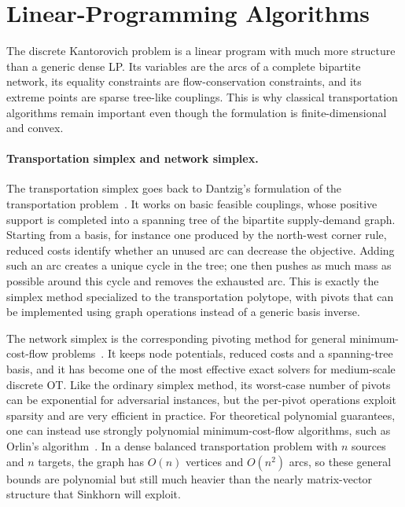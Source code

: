 \section{Linear-Programming Algorithms}
\label{sec-kantorovich-lp-algorithms}

The discrete Kantorovich problem is a linear program with much more structure than a generic dense LP\@. Its variables are the arcs of a complete bipartite network, its equality constraints are flow-conservation constraints, and its extreme points are sparse tree-like couplings. This is why classical transportation algorithms remain important even though the formulation is finite-dimensional and convex.

\paragraph{Transportation simplex and network simplex.}\label{par-transportation-simplex}

The transportation simplex goes back to Dantzig's formulation of the transportation problem~\cite{Dantzig51}. It works on basic feasible couplings, whose positive support is completed into a spanning tree of the bipartite supply-demand graph. Starting from a basis, for instance one produced by the north-west corner rule, reduced costs identify whether an unused arc can decrease the objective. Adding such an arc creates a unique cycle in the tree; one then pushes as much mass as possible around this cycle and removes the exhausted arc. This is exactly the simplex method specialized to the transportation polytope, with pivots that can be implemented using graph operations instead of a generic basis inverse.

The network simplex is the corresponding pivoting method for general minimum-cost-flow problems~\cite{bertsekas1988dual}. It keeps node potentials, reduced costs and a spanning-tree basis, and it has become one of the most effective exact solvers for medium-scale discrete OT\@. Like the ordinary simplex method, its worst-case number of pivots can be exponential for adversarial instances, but the per-pivot operations exploit sparsity and are very efficient in practice. For theoretical polynomial guarantees, one can instead use strongly polynomial minimum-cost-flow algorithms, such as Orlin's algorithm~\cite{Orlin1997}. In a dense balanced transportation problem with $n$ sources and $n$ targets, the graph has $O(n)$ vertices and $O(n^2)$ arcs, so these general bounds are polynomial but still much heavier than the nearly matrix-vector structure that Sinkhorn will exploit.

